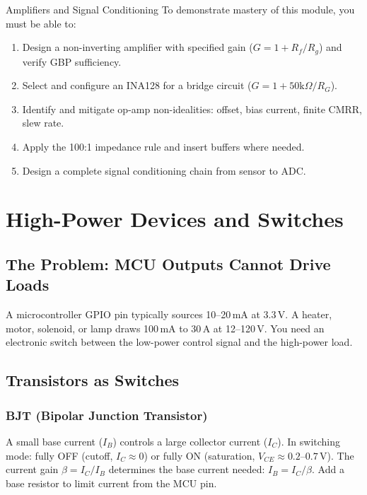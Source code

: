 \documentclass[11pt,letterpaper,twoside,openany]{book}
\begin{document}

\begin{masterycheckbox}{Amplifiers and Signal Conditioning}
To demonstrate mastery of this module, you must be able to:
\begin{enumerate}[nosep,leftmargin=1.5em]
\item Design a non-inverting amplifier with specified gain ($G = 1 + R_f/R_g$) and verify GBP sufficiency.
\item Select and configure an INA128 for a bridge circuit ($G = 1 + 50\text{k}\Omega/R_G$).
\item Identify and mitigate op-amp non-idealities: offset, bias current, finite CMRR, slew rate.
\item Apply the 100:1 impedance rule and insert buffers where needed.
\item Design a complete signal conditioning chain from sensor to ADC.
\end{enumerate}
\end{masterycheckbox}

\chapter{High-Power Devices and Switches}
\label{ch:highpower}

\section{The Problem: MCU Outputs Cannot Drive Loads}
A microcontroller GPIO pin typically sources 10--20\,mA at 3.3\,V. A heater, motor, solenoid, or lamp draws 100\,mA to 30\,A at 12--120\,V. You need an electronic switch between the low-power control signal and the high-power load.

\section{Transistors as Switches}

\subsection{BJT (Bipolar Junction Transistor)}
A small base current ($I_B$) controls a large collector current ($I_C$). In switching mode: fully OFF (cutoff, $I_C \approx 0$) or fully ON (saturation, $V_{CE} \approx 0.2$--$0.7$\,V). The current gain $\beta = I_C / I_B$ determines the base current needed: $I_B = I_C / \beta$. Add a base resistor to limit current from the MCU pin.
\end{document}
